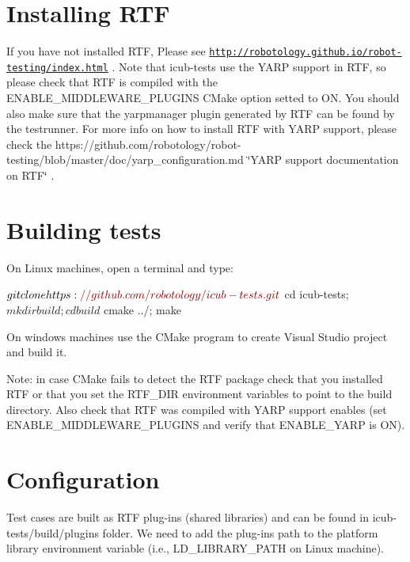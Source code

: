 \hypertarget{installation_installing_rtf}{}\section{Installing R\+TF}\label{installation_installing_rtf}
If you have not installed R\+TF, Please see \href{http://robotology.github.io/robot-testing/index.html}{\tt http\+://robotology.\+github.\+io/robot-\/testing/index.\+html} . Note that {\ttfamily icub-\/tests} use the Y\+A\+RP support in R\+TF, so please check that R\+TF is compiled with the {\ttfamily E\+N\+A\+B\+L\+E\+\_\+\+M\+I\+D\+D\+L\+E\+W\+A\+R\+E\+\_\+\+P\+L\+U\+G\+I\+NS} C\+Make option setted to ON. You should also make sure that the yarpmanager plugin generated by R\+TF can be found by the testrunner. For more info on how to install R\+TF with Y\+A\+RP support, please check the https\+://github.com/robotology/robot-\/testing/blob/master/doc/yarp\+\_\+configuration.\+md \char`\"{}\+Y\+A\+R\+P support documentation on R\+T\+F\char`\"{} .\hypertarget{installation_building_tests}{}\section{Building tests}\label{installation_building_tests}
On Linux machines, open a terminal and type\+: 
\begin{DoxyCode}
$ git clone https:\textcolor{comment}{//github.com/robotology/icub-tests.git}
$ cd icub-tests; 
$ mkdir build; cd build
$ cmake ../; make
\end{DoxyCode}


On windows machines use the C\+Make program to create Visual Studio project and build it.

Note\+: in case C\+Make fails to detect the R\+TF package check that you installed R\+TF or that you set the R\+T\+F\+\_\+\+D\+IR environment variables to point to the build directory. Also check that R\+TF was compiled with Y\+A\+RP support enables (set {\ttfamily E\+N\+A\+B\+L\+E\+\_\+\+M\+I\+D\+D\+L\+E\+W\+A\+R\+E\+\_\+\+P\+L\+U\+G\+I\+NS} and verify that {\ttfamily E\+N\+A\+B\+L\+E\+\_\+\+Y\+A\+RP} is ON).\hypertarget{installation_soncifugration}{}\section{Configuration}\label{installation_soncifugration}
Test cases are built as R\+TF plug-\/ins (shared libraries) and can be found in {\ttfamily icub-\/tests/build/plugins} folder. We need to add the plug-\/ins path to the platform library environment variable (i.\+e., {\ttfamily L\+D\+\_\+\+L\+I\+B\+R\+A\+R\+Y\+\_\+\+P\+A\+TH} on Linux machine).


